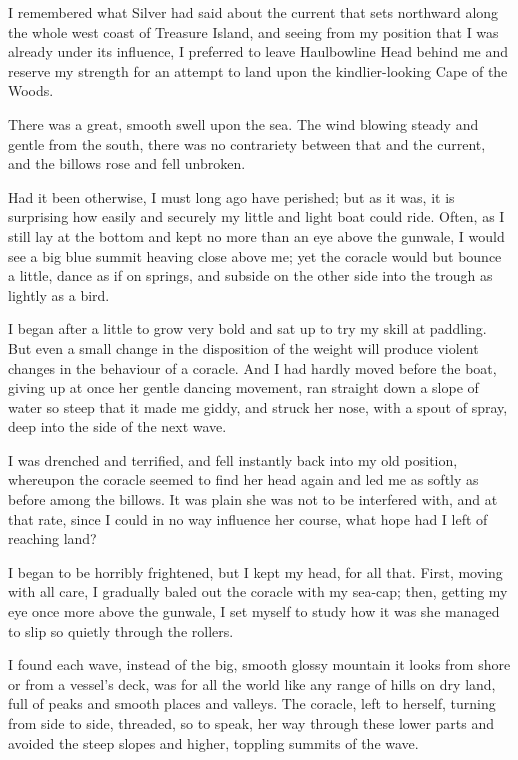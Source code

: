 I remembered what Silver had said about the current that sets northward along the whole west coast of Treasure Island, and seeing from my position that I was already under its influence, I preferred to leave Haulbowline Head behind me and reserve my strength for an attempt to land upon the kindlier-looking Cape of the Woods.

There was a great, smooth swell upon the sea. The wind blowing steady and gentle from the south, there was no contrariety between that and the current, and the billows rose and fell unbroken.

Had it been otherwise, I must long ago have perished; but as it was, it is surprising how easily and securely my little and light boat could ride. Often, as I still lay at the bottom and kept no more than an eye above the gunwale, I would see a big blue summit heaving close above me; yet the coracle would but bounce a little, dance as if on springs, and subside on the other side into the trough as lightly as a bird.

I began after a little to grow very bold and sat up to try my skill at paddling. But even a small change in the disposition of the weight will produce violent changes in the behaviour of a coracle. And I had hardly moved before the boat, giving up at once her gentle dancing movement, ran straight down a slope of water so steep that it made me giddy, and struck her nose, with a spout of spray, deep into the side of the next wave.

I was drenched and terrified, and fell instantly back into my old position, whereupon the coracle seemed to find her head again and led me as softly as before among the billows. It was plain she was not to be interfered with, and at that rate, since I could in no way influence her course, what hope had I left of reaching land?

I began to be horribly frightened, but I kept my head, for all that. First, moving with all care, I gradually baled out the coracle with my sea-cap; then, getting my eye once more above the gunwale, I set myself to study how it was she managed to slip so quietly through the rollers.

I found each wave, instead of the big, smooth glossy mountain it looks from shore or from a vessel's deck, was for all the world like any range of hills on dry land, full of peaks and smooth places and valleys. The coracle, left to herself, turning from side to side, threaded, so to speak, her way through these lower parts and avoided the steep slopes and higher, toppling summits of the wave.

